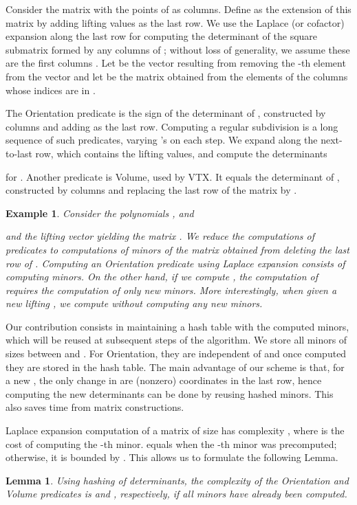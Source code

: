 \documentclass{article}
\newtheorem{example}{Example}
\newtheorem{lemma}{Lemma}
\begin{document}
Consider the  matrix with the points of  as columns.
Define  as the extension of this matrix by adding lifting values
 as the last row.
We use the Laplace (or cofactor) expansion along the last row for computing
the determinant of the square submatrix formed by any  columns of
; without loss of generality, we assume these are the first 
columns .
Let   be the vector
resulting from removing the -th element from the vector 
 and let 
be the  matrix obtained from the
 elements of the columns whose indices are in 
.

The Orientation predicate is the sign of the determinant of
,
constructed by columns
 and adding  as the last row.
Computing a regular subdivision is a long sequence of such predicates,
varying 's on each step.
We expand along the next-to-last row, which contains the lifting values,
and compute the determinants

for .
Another predicate is Volume, used by {VTX}.
It equals the determinant of ,
constructed by columns 
and replacing the last row of the matrix by .

\begin{example}\label{ExamHash}
Consider the polynomials
,
 and

and the lifting vector  yielding the matrix .
\setlength{\tabcolsep}{0pt} \newcommand{\w}{6mm} 
We reduce the computations of predicates to computations of minors of the
matrix obtained from deleting the last row of .
Computing an Orientation predicate using Laplace expansion consists of
computing  minors. On the other hand, if we compute
, the computation of
 requires
the computation of only
 new minors.
More interestingly, when given a new lifting , we
compute 
without computing any new minors.
\end{example}

Our contribution consists in maintaining a hash table with the computed
minors, which will be reused at subsequent steps of the algorithm.  
We store all minors of sizes between  and .
For Orientation, they are independent of  and once computed they
are stored in the hash table.
The main advantage of our scheme is that, for a new , the only change
in  are  (nonzero) coordinates in the last row, hence 
computing the new determinants
can be done by reusing hashed minors.
This also saves time from matrix constructions.

Laplace expansion computation of a matrix of size  has
complexity\linebreak
, where  is the cost of computing the
-th minor.  equals  when the -th minor was
precomputed; otherwise, it is bounded by .
This allows us to formulate the following Lemma.
\begin{lemma}
Using hashing of determinants, the complexity of the Orientation and Volume
predicates is  and , respectively, if all minors have
already been computed.
\end{lemma}
\end{document}
